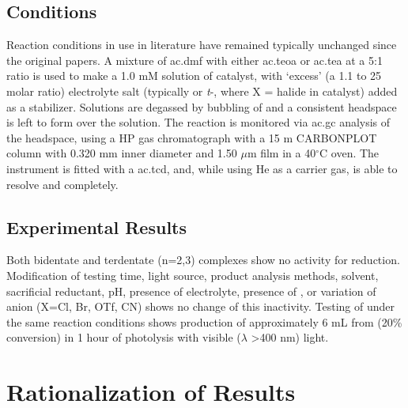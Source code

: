 \subsection{Conditions}

Reaction conditions in use in literature have remained typically unchanged since the original papers. A mixture of \gls{ac.dmf} with either \gls{ac.teoa} or \gls{ac.tea} at a 5:1 ratio is used to make a 1.0 mM solution of catalyst, with `excess' (a 1.1 to 25 molar ratio) electrolyte salt (typically  or \textit{t}-, where X = halide in catalyst) added as a stabilizer. Solutions are degassed by bubbling of  and a consistent headspace is left to form over the solution. The reaction is monitored via \gls{ac.gc} analysis of the headspace, using a HP gas chromatograph with a 15 m CARBONPLOT column with 0.320 mm inner diameter and 1.50 $\mu$m film in a 40$^\circ$C oven. The instrument is fitted with a \gls{ac.tcd}, and, while using He as a carrier gas, is able to resolve  and  completely.  

\subsection{Experimental Results}

Both bidentate and terdentate  (n=2,3) complexes show no activity for  reduction. Modification of testing time, light source, product analysis methods, solvent, sacrificial reductant, pH, presence of electrolyte, presence of , or variation of anion (X=Cl, Br, OTf, CN) shows no change of this inactivity. Testing of  under the same reaction conditions shows production of approximately 6 mL  from  (20\% conversion) in 1 hour of photolysis with visible ($\lambda$ \textgreater 400 nm) light.

\section{Rationalization of Results}


